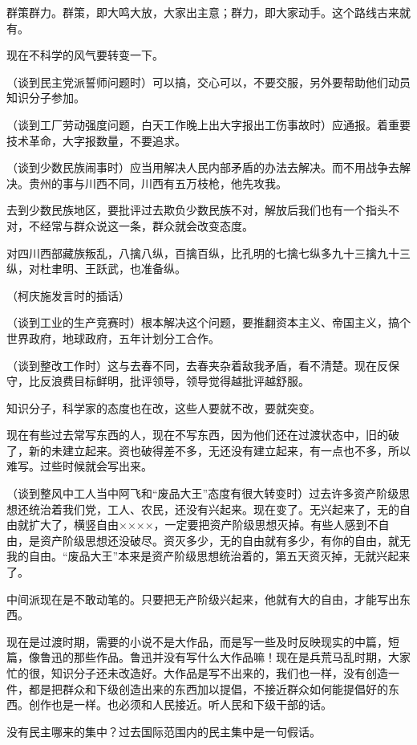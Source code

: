 群策群力。群策，即大鸣大放，大家出主意；群力，即大家动手。这个路线古来就有。

现在不科学的风气要转变一下。

（谈到民主党派誓师问题时）可以搞，交心可以，不要交服，另外要帮助他们动员知识分子参加。

（谈到工厂劳动强度问题，白天工作晚上出大字报出工伤事故时）应通报。着重要技术革命，大字报数量，不要追求。

（谈到少数民族闹事时）应当用解决人民内部矛盾的办法去解决。而不用战争去解决。贵州的事与川西不同，川西有五万枝枪，他先攻我。

去到少数民族地区，要批评过去欺负少数民族不对，解放后我们也有一个指头不对，不经常与群众说这一条，群众就会改变态度。

对四川西部藏族叛乱，八擒八纵，百擒百纵，比孔明的七擒七纵多九十三擒九十三纵，对杜聿明、王跃武，也准备纵。

（柯庆施发言时的插话）

（谈到工业的生产竞赛时）根本解决这个问题，要推翻资本主义、帝国主义，搞个世界政府，地球政府，五年计划分工合作。

（谈到整改工作时）这与去春不同，去春夹杂着敌我矛盾，看不清楚。现在反保守，比反浪费目标鲜明，批评领导，领导觉得越批评越舒服。

知识分子，科学家的态度也在改，这些人要就不改，要就突变。

现在有些过去常写东西的人，现在不写东西，因为他们还在过渡状态中，旧的破了，新的未建立起来。资也破得差不多，无还没有建立起来，有一点也不多，所以难写。过些时候就会写出来。

（谈到整风中工人当中阿飞和“废品大王”态度有很大转变时）过去许多资产阶级思想还统治着我们党，工人、农民，还没有兴起来。现在变了。无兴起来了，无的自由就扩大了，横竖自由××××，一定要把资产阶级思想灭掉。有些人感到不自由，是资产阶级思想还没破尽。资灭多少，无的自由就有多少，有你的自由，就无我的自由。“废品大王”本来是资产阶级思想统治着的，第五天资灭掉，无就兴起来了。

中间派现在是不敢动笔的。只要把无产阶级兴起来，他就有大的自由，才能写出东西。

现在是过渡时期，需要的小说不是大作品，而是写一些及时反映现实的中篇，短篇，像鲁迅的那些作品。鲁迅并没有写什么大作品嘛！现在是兵荒马乱时期，大家忙的很，知识分子还未改造好。大作品是写不出来的，我们也一样，没有创造一件，都是把群众和下级创造出来的东西加以提倡，不接近群众如何能提倡好的东西。创作也是一样。也必须和人民接近。听人民和下级干部的话。

没有民主哪来的集中？过去国际范围内的民主集中是一句假话。

